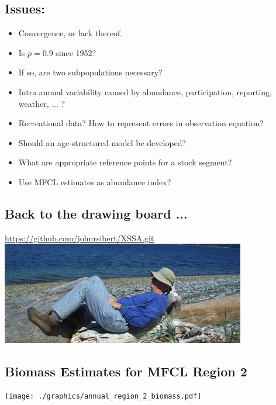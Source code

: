 \documentclass[a4paper,KOMA,landscape,titlepage]{powersem}
\begin{document}
\begin{slide}\section{Issues:}
\begin{itemize}
\item Convergence, or lack thereof.
\item Is $\bar{p} = 0.9$ since 1952?
\item If so, are two subpopulations necessary?
\item Intra annual variability caused by abundance, participation,
reporting, weather, ... ?
\item Recreational data? How to represent errors in observation
equation?
\item Should an age-structured model be developed?
\item What are appropriate reference points for a stock segment?
\item Use MFCL estimates as abundance index?
\end{itemize}
\end{slide}

\begin{slide}\section{Back to the drawing board ...}
\begin{center}
\url{https://github.com/johnrsibert/XSSA.git}
\includegraphics[width=0.8\textwidth]{./graphics/recumbant.png}
\end{center}
\end{slide}



\begin{slide}\section{Biomass Estimates for MFCL Region 2}
\label{fig:MFCL2}
\begin{center}
\texttt{[image: ./graphics/annual\_region\_2\_biomass.pdf]}
\end{center}
\end{slide}
\end{document}
